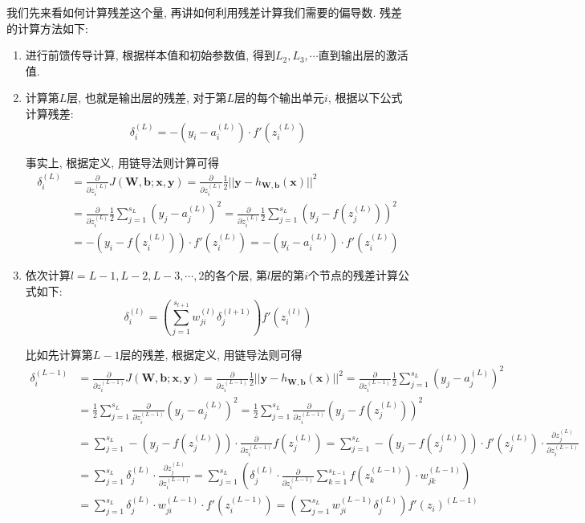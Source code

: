 \documentclass[a4paper,UTF8]{ctexart}
\theoremstyle{plain} \newtheorem{theorem}{定理}[section]
\theoremstyle{plain} \newtheorem{definition}{定义}[section]
\theoremstyle{plain} \newtheorem{lemma}{引理}[section]
\theoremstyle{plain} \newtheorem{proposition}{命题}[section]
\theoremstyle{plain} \newtheorem{example}{例}[section]
\theoremstyle{plain} \newtheorem{remark}{注}[section]
\theoremstyle{plain} \newtheorem{corollary}{推论}[section]
\begin{document}
我们先来看如何计算残差这个量, 再讲如何利用残差计算我们需要的偏导数. 残差的计算方法如下:
\begin{enumerate}[(1)]
\item 进行前馈传导计算, 根据样本值和初始参数值, 得到$L_{2}, L_{3}, \cdots$直到输出层的激活值.

\item 计算第$L$层, 也就是输出层的残差, 对于第$L$层的每个输出单元$i$, 根据以下公式计算残差:
\begin{equation*}
\delta_{i}^{(L)} = -(y_{i} - a_{i}^{(L)}) \cdot f'(z_{i}^{(L)})
\end{equation*}

事实上, 根据定义, 用链导法则计算可得
\begin{align*}
\delta_{i}^{(L)} & = \frac{\partial}{\partial z_{i}^{(L)}} J(\bm{W},\bm{b}; \bm{x},\bm{y}) = \frac{\partial}{\partial z_{i}^{(L)}} \frac{1}{2} ||\bm{y} - h_{\bm{W},\bm{b}}(\bm{x})||^2 \\ 
& = \frac{\partial}{\partial z_{i}^{(L)}} \frac{1}{2} \sum_{j=1}^{s_L}(y_{j} - a_{j}^{(L)})^2 = \frac{\partial}{\partial z_{i}^{(L)}} \frac{1}{2} \sum_{j=1}^{s_L} (y_{j} - f(z_{j}^{(L)}))^2 \\ 
& = -(y_{i} - f(z_{i}^{(L)})) \cdot f'(z_{i}^{(L)}) = -(y_{i} - a_{i}^{(L)}) \cdot f'(z_{i}^{(L)})
\end{align*}


\item 依次计算$l = L-1, L-2, L-3, \cdots, 2$的各个层, 第$l$层的第$i$个节点的残差计算公式如下:
\begin{equation*}
\delta_{i}^{(l)} = \left( \sum_{j=1}^{s_{l+1}} w_{ji}^{(l)} \delta_{j}^{(l+1)} \right) f'(z_{i}^{(l)})
\end{equation*}

比如先计算第$L - 1$层的残差, 根据定义, 用链导法则可得
\begin{align*}
\delta_{i}^{(L-1)} & = \frac{\partial}{\partial z_{i}^{(L-1)}} J(\bm{W},\bm{b};\bm{x},\bm{y}) = \frac{\partial}{\partial z_{i}^{(L-1)}} \frac{1}{2} ||\bm{y} - h_{\bm{W},\bm{b}}(\bm{x})||^2 = \frac{\partial}{\partial z_{i}^{(L-1)}} \frac{1}{2} \sum_{j=1}^{s_L} (y_{j} - a_{j}^{(L)})^2 \\ 
& = \frac{1}{2} \sum_{j=1}^{s_L} \frac{\partial}{\partial z_{i}^{(L-1)}} (y_{j} - a_{j}^{(L)})^2 = \frac{1}{2} \sum_{j=1}^{s_L} \frac{\partial}{\partial z_{i}^{(L-1)}} (y_{j} - f(z_{j}^{(L)}))^2 \\ 
& = \sum_{j=1}^{s_L} -(y_{j} - f(z_{j}^{(L)})) \cdot \frac{\partial}{\partial z_{i}^{(L-1)}} f(z_{j}^{(L)}) = \sum_{j=1}^{s_L} -(y_{j} - f(z_{j}^{(L)})) \cdot f'(z_{j}^{(L)}) \cdot \frac{\partial z_{j}^{(L)}}{\partial z_{i}^{(L-1)}} \\ 
& = \sum_{j=1}^{s_L} \delta_{j}^{(L)} \cdot \frac{\partial z_{j}^{(L)}}{\partial z_{i}^{(L-1)}} = \sum_{j=1}^{s_L} \left( \delta_{j}^{(L)} \cdot \frac{\partial}{\partial z_{i}^{(L-1)}} \sum_{k=1}^{s_{L-1}} f(z_{k}^{(L-1)}) \cdot w_{jk}^{(L-1)} \right) \\ 
& = \sum_{j=1}^{s_L} \delta_{j}^{(L)} \cdot w_{ji}^{(L-1)} \cdot f'(z_{i}^{(L-1)}) = \left( \sum_{j=1}^{s_L} w_{ji}^{(L-1)} \delta_{j}^{(L)} \right) f'(z_{i})^{(L-1)}
\end{align*}


\end{enumerate}
\end{document}
